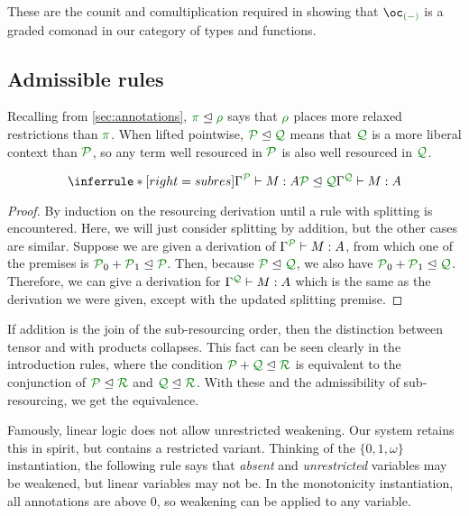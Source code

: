 These are the counit and comultiplication required in showing that $\excl{(-)}{}$ is a
graded comonad in our category of types and functions.


\subsection{Admissible rules}
\label{sec:admissible}

Recalling from \autoref{sec:annotations}, $\rescomment \pi \subres \rescomment
\rho$ says that $\rescomment \rho$ places more relaxed restrictions than
$\rescomment \pi$.
When lifted pointwise, $\resctx P \subres \resctx Q$ means that
$\resctx Q$ is a more liberal context than $\resctx
 P$, so any term well resourced in $\resctx P$ is also well
resourced in $\resctx Q$.

\begin{lemma}
  \[
    \inferrule*[right=subres]{
      \ctx{\Gamma}{P} \vdash M : A
      \\ \resctx P \subres \resctx Q
    }
    {
      \ctx{\Gamma}{Q} \vdash M : A
    }
  \]
\end{lemma}
\begin{proof}
  By induction on the resourcing derivation until a rule with splitting is
  encountered.
  Here, we will just consider splitting by addition, but the other cases are
  similar.
  Suppose we are given a derivation of $\ctx{\Gamma}{P} \vdash M : A$,
  from which one of the premises is
  $\resctx P_0 + \resctx P_1 \subres \resctx P$.
  Then, because $\resctx P \subres \resctx Q$, we also have
  $\resctx P_0 + \resctx P_1 \subres \resctx Q$.
  Therefore, we can give a derivation for
  $\ctx{\Gamma}{Q} \vdash M : A$ which is the same as the derivation we
  were given, except with the updated splitting premise.
\end{proof}

If addition is the join of the sub-resourcing order, then the distinction
between tensor and with products collapses.
This fact can be seen clearly in the introduction rules, where the condition
$\resctx P + \resctx Q \subres \resctx R$ is equivalent to the conjunction of
$\resctx P \subres \resctx R$ and $\resctx Q \subres \resctx R$.
With these and the admissibility of sub-resourcing, we get the equivalence.

Famously, linear logic does not allow unrestricted weakening.
Our system retains this in spirit, but contains a restricted variant.
Thinking of the $\{0,1,\omega\}$ instantiation, the following rule says that
\emph{absent} and \emph{unrestricted} variables may be weakened, but linear
variables may not be.
In the monotonicity instantiation, all annotations are above $0$, so weakening
can be applied to any variable.

